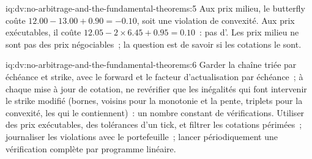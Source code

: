 \begin{solution}{iq:dv:no-arbitrage-and-the-fundamental-theorems:5}
Aux prix milieu, le butterfly coûte $12.00-13.00+0.90=-0.10$, soit une violation de convexité. Aux
prix exécutables, il coûte $12.05-2\times6.45+0.95=0.10$~: pas d'. Les
prix milieu ne sont pas des prix négociables~; la question est de savoir si les cotations le sont.
\end{solution}

\begin{solution}{iq:dv:no-arbitrage-and-the-fundamental-theorems:6}
Garder la chaîne triée par échéance et strike, avec le forward et le facteur d'actualisation par
échéance~; à chaque mise à jour de cotation, ne revérifier que les inégalités qui font intervenir le
strike modifié (bornes, voisins pour la monotonie et la pente, triplets pour la
convexité, les  qui le contiennent)~: un nombre constant de vérifications. Utiliser des
prix exécutables, des tolérances d'un tick, et filtrer les cotations périmées~; journaliser les violations avec
le portefeuille~; lancer périodiquement une vérification complète par programme linéaire.
\end{solution}
